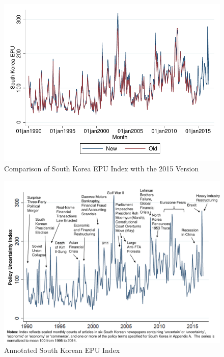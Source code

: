 \begin{landscape}
\begin{figure}[H] \caption{Comparison of South Korea EPU Index with the 2015 Version} \label{fig:stdepu_final_old}
\centering
		\includegraphics[scale=1.4]{../output/plots/plot_final_skepu_w2015.pdf}
		
\end{figure}

\begin{figure}[H] \caption{Annotated South Korean EPU Index} \label{fig:annotated}
\centering
		\includegraphics[scale=0.85]{../output/plots/annotated-epu-chart.pdf}
		
\end{figure}
\end{landscape}


